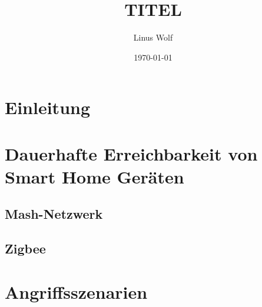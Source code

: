 \documentclass[12pt, a4paper, onecolumn, oneside, toc=bibliographynumbered, liststotoc]{scrartcl} %
\begin{document}
	\titlehead{Hochschule Rhein-Waal \\ %
	Fakultät: Kommunikation und Umwelt\\
	Studiengang: Verwaltungsinformatik\\
	Modul: XXXXXXXXXXXXXXXX\\}
	\title{TITEL} %
	\author{Linus Wolf}
	\date{\today} %

\maketitle %

\newpage %
\tableofcontents %

\newpage %

	\section{Einleitung}

	\section{Dauerhafte Erreichbarkeit von Smart Home Geräten}
		\subsection{Mash-Netzwerk}
		\subsection{Zigbee}
	
	\section{Angriffsszenarien}
\end{document}
